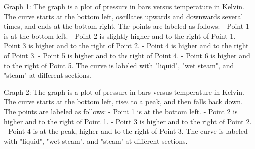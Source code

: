 Graph 1: The graph is a plot of pressure in bars versus temperature in Kelvin. The curve starts at the bottom left, oscillates upwards and downwards several times, and ends at the bottom right. The points are labeled as follows:
- Point 1 is at the bottom left.
- Point 2 is slightly higher and to the right of Point 1.
- Point 3 is higher and to the right of Point 2.
- Point 4 is higher and to the right of Point 3.
- Point 5 is higher and to the right of Point 4.
- Point 6 is higher and to the right of Point 5.
The curve is labeled with "liquid", "wet steam", and "steam" at different sections.

Graph 2: The graph is a plot of pressure in bars versus temperature in Kelvin. The curve starts at the bottom left, rises to a peak, and then falls back down. The points are labeled as follows:
- Point 1 is at the bottom left.
- Point 2 is higher and to the right of Point 1.
- Point 3 is higher and to the right of Point 2.
- Point 4 is at the peak, higher and to the right of Point 3.
The curve is labeled with "liquid", "wet steam", and "steam" at different sections.